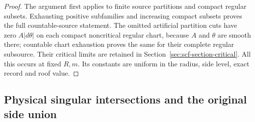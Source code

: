 \begin{proof}
The argument first applies to finite source partitions and compact
regular subsets. Exhausting positive subfamilies and increasing
compact subsets proves the full countable-source statement.
The omitted artificial partition cuts have zero $A|d\theta|$
on each compact noncritical regular chart, because $A$ and $\theta$
are smooth there; countable chart exhaustion proves the same
for their complete regular subsource. Their critical limits are
retained in Section~\ref{sec:scf-section-critical}.
All this occurs at fixed $R,m$. Its constants are uniform in the
radius, side level, exact record and roof value.
\end{proof}

\subsection{Physical singular intersections and the original side union}

